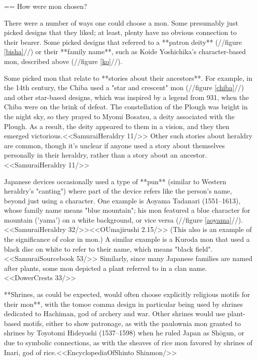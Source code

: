   == How were mon chosen?

  There were a number of ways one could choose a mon.  Some presumably
  just picked designs that they liked; at least, plenty have no
  obvious connection to their bearer.  Some picked designs that
  referred to a **patron deity** (//figure \ref{bisha}//) or their
  **family name**, such as Koide Yoshichika's character-based mon,
  described above (//figure \ref{ko}//).

  Some picked mon that relate to **stories about their ancestors**.
  For example, in the 14th century, the Chiba used a "star and
  crescent" mon (//figure \ref{chiba}//) and other star-based designs,
  which was inspired by a legend from 931, when the Chiba were on the
  brink of defeat.  The constellation of the Plough was bright in the
  night sky, so they prayed to Myomi Bosatsu, a deity associated with
  the Plough.  As a result, the deity appeared to them in a vision,
  and they then emerged victorious.<<SamuraiHeraldry 11/>> Other such
  stories about heraldry are common, though it's unclear if anyone
  used a story about themselves personally in their heraldry, rather
  than a story about an ancestor.<<SamuraiHeraldry 11/>>

  Japanese devices occasionally used a type of **pun** (similar to
  Western heraldry's "canting") where part of the device refers like
  the person's name, beyond just using a character.  One example is Aoyama
  Tadanari (1551--1613), whose family name means "blue mountain"; his
  mon featured a blue character for mountain ('yama') on a white
  background, or vice versa (//figure
  \ref{aoyama}//).<<SamuraiHeraldry 32/>><<OUmajirushi 2.15/>> (This
  also is an example of the significance of color in mon.)  A
  similar example is a Kuroda mon that used a black disc on white to
  refer to their name, which means "black field".<<SamuraiSourcebook
  53/>> Similarly, since many Japanese families are named after
  plants, some mon depicted a plant referred to in a clan
  name.<<DowerCrests 33/>>

  **Shrines, as could be expected, would often choose explicitly
  religious motifs for their mon**, with the tomoe comma design in
  particular being used by shrines dedicated to Hachiman, god of
  archery and war.  Other shrines would use plant-based motifs, either
  to show patronage, as with the paulownia mon granted to shrines by
  Toyotomi Hideyoshi (1537--1598) when he ruled Japan as Sh\=ogun, or
  due to symbolic connections, as with the sheaves of rice mon favored
  by shrines of Inari, god of rice.<<EncyclopediaOfShinto Shinmon/>>

